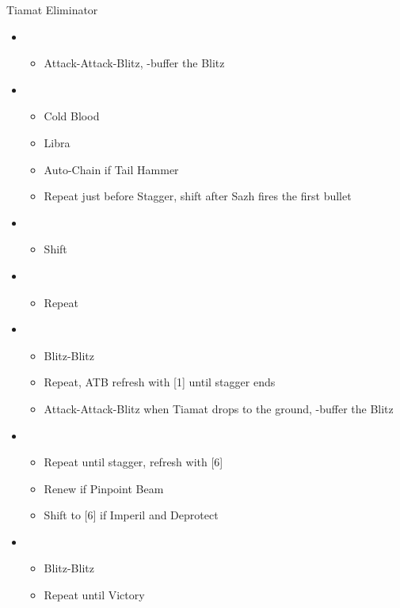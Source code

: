 	\begin{battle}[1:55]{Tiamat Eliminator}
		\begin{itemize}
			\item \second
			      \begin{itemize}
				      \item Attack-Attack-Blitz, \rav-buffer the Blitz
			      \end{itemize}
			\item \sixth
			      \begin{itemize}
				      \item Cold Blood
				      \item Libra
				      \item Auto-Chain if Tail Hammer
				      \item Repeat just before Stagger, shift after Sazh fires the first bullet
			      \end{itemize}
			\item \fourth
			      \begin{itemize}
				      \item Shift
			      \end{itemize}
			\item \sixth
			      \begin{itemize}
				      \item Repeat
			      \end{itemize}
			\item \second
			      \begin{itemize}
				      \item Blitz-Blitz
				      \item Repeat, ATB refresh with [1] until stagger ends
				      \item Attack-Attack-Blitz when Tiamat drops to the ground, \rav-buffer the Blitz
			      \end{itemize}
			\item \fifth
			      \begin{itemize}
				      \item Repeat until stagger, refresh with [6]
				      \item Renew if Pinpoint Beam
				      \item Shift to [6] if Imperil and Deprotect
			      \end{itemize}
			\item \second
			      \begin{itemize}
				      \item Blitz-Blitz
				      \item Repeat until Victory
			      \end{itemize}
		\end{itemize}
	\end{battle}


